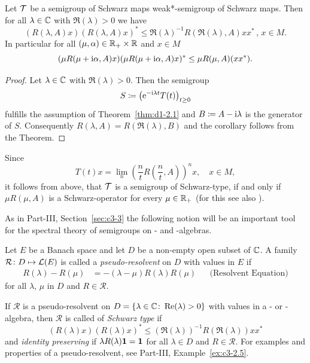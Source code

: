 \begin{corollary}\label{cor:d1-2.2}
Let $ \mathcal{T} $ be a semigroup of Schwarz maps \resp weak*-semigroup of Schwarz maps.
Then for all $ \lambda \in \mathbb{C} $ with $ \Re(\lambda)  > 0 $ we have
\[
	\left( R(\lambda,A)x \right) \left( R(\lambda,A)x \right)^{*} 
		\leq \Re(\lambda)^{-1} R(\Re(\lambda),A)xx^{*} \, , \, x \in M .
\]
In particular for all $ (\mu,\alpha) \in \mathbb{R}_{+} \times \mathbb{R} $ and $ x \in M $
\[
(\mu R(\mu + \im \alpha,A)x)(\mu R(\mu + \im \alpha,A)x)^{*} \leq \mu R(\mu,A)(xx^{*}).
\]
\end{corollary}
\begin{proof}
Let $ \lambda \in \mathbb{C} $ with $ \Re(\lambda) > 0 $.
Then the semigroup
\[
S \coloneq \left(\eu^{- \im  \lambda t }T(t) \right)_{t \geq 0}
\]
fulfills the assumption of Theorem~\ref{thm:d1-2.1} and $ B \coloneq A - \mathrm{i} \lambda $ is the generator of\/ $ S $.
Consequently $ R(\lambda,A) = R(\Re(\lambda),B) $ and the corollary follows from the Theorem.
\end{proof}
\begin{remark}\label{rem:d1-2.3}
Since 
%
\[
	T(t)x = \lim_{n} \left( \frac{n}{t} R\left(\frac{n}{t}, A\right) \right)^{n} x , \quad x \in M , 
\]
%
it follows from above, that $ \mathcal{T} $ is a semigroup of Schwarz-type, if and only if\/ $ \mu R( \mu, A) $ is a Schwarz-operator for every $ \mu \in \mathbb{R}_{+} $ (for this see also \textcite{brattelirobinson:1981}).
\end{remark}
As in Part-III, Section~\ref{sec:c3-3}  the following notion will be an important tool for the spectral theory of semigroups on \CA- and \WA-algebras.
\begin{definition}\label{def:d1-2.4}
Let $E$ be a Banach space and let $D$ be a non-empty open subset of\/ $\mathbb{C}$.
A family $ \mathcal{R} \colon D \mapsto \mathcal{L}(E) $ is called a \emph{pseudo-resolvent} on $ D $ with values in $ E $ if
\begin{align*}
	R(\lambda) - R(\mu) &= -(\lambda - \mu)R(\lambda)R(\mu) &&\text{(Resolvent Equation)}
\end{align*}
for all $ \lambda $, $ \mu $ in $ D $ and $ R \in \mathcal{R} $.
\end{definition}
If\/ $ \mathcal{R} $ is a {pseudo-resolvent} on $ D = \{\lambda \in \mathbb{C} \colon \mathop{}\!\mathrm{Re}(\lambda) > 0\} $ with values in a \CA- or \WA-algebra, then $ \mathcal{R} $ is called of \emph{Schwarz type} 
if
\[
	(R(\lambda)x)(R(\lambda)x)^{*} \leq (\Re (\lambda) )^{-1} R(\Re(\lambda))xx^{*}
\]
and \emph{identity preserving} if\/ $ \lambda R(\lambda)\mathbf{1} = \mathbf{1} $ for all $ \lambda \in D $ and $ R \in \mathcal{R} $.
For examples and properties of a pseudo-resolvent, see Part-III, Example~\ref{ex:c3-2.5}.

